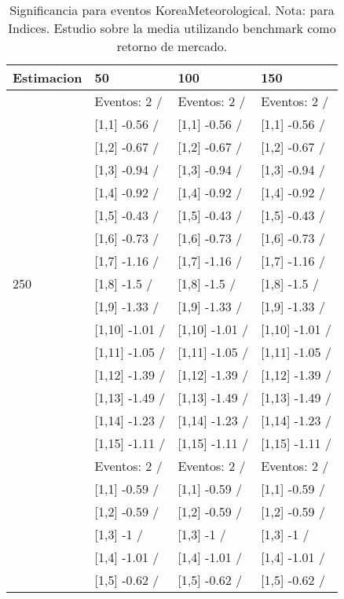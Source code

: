 \begin{table}

\caption{Significancia para eventos KoreaMeteorological. Nota: para Indices. Estudio sobre la media utilizando benchmark como retorno de mercado.}
\centering
\begin{tabular}[t]{llll}
\toprule
Estimacion & 50 & 100 & 150\\
\midrule
 & Eventos:  2 / & Eventos:  2 / & Eventos:  2 /\\
 & {}[1,1] -0.56  / & {}[1,1] -0.56  / & {}[1,1] -0.56  /\\
 & {}[1,2] -0.67  / & {}[1,2] -0.67  / & {}[1,2] -0.67  /\\
 & {}[1,3] -0.94  / & {}[1,3] -0.94  / & {}[1,3] -0.94  /\\
 & {}[1,4] -0.92  / & {}[1,4] -0.92  / & {}[1,4] -0.92  /\\
\addlinespace
 & {}[1,5] -0.43  / & {}[1,5] -0.43  / & {}[1,5] -0.43  /\\
 & {}[1,6] -0.73  / & {}[1,6] -0.73  / & {}[1,6] -0.73  /\\
 & {}[1,7] -1.16  / & {}[1,7] -1.16  / & {}[1,7] -1.16  /\\
250 & {}[1,8] -1.5  / & {}[1,8] -1.5  / & {}[1,8] -1.5  /\\
 & {}[1,9] -1.33  / & {}[1,9] -1.33  / & {}[1,9] -1.33  /\\
\addlinespace
 & {}[1,10] -1.01  / & {}[1,10] -1.01  / & {}[1,10] -1.01  /\\
 & {}[1,11] -1.05  / & {}[1,11] -1.05  / & {}[1,11] -1.05  /\\
 & {}[1,12] -1.39  / & {}[1,12] -1.39  / & {}[1,12] -1.39  /\\
 & {}[1,13] -1.49  / & {}[1,13] -1.49  / & {}[1,13] -1.49  /\\
 & {}[1,14] -1.23  / & {}[1,14] -1.23  / & {}[1,14] -1.23  /\\
\addlinespace
 & {}[1,15] -1.11  / & {}[1,15] -1.11  / & {}[1,15] -1.11  /\\
 & Eventos:  2 / & Eventos:  2 / & Eventos:  2 /\\
 & {}[1,1] -0.59  / & {}[1,1] -0.59  / & {}[1,1] -0.59  /\\
 & {}[1,2] -0.59  / & {}[1,2] -0.59  / & {}[1,2] -0.59  /\\
 & {}[1,3] -1  / & {}[1,3] -1  / & {}[1,3] -1  /\\
\addlinespace
 & {}[1,4] -1.01  / & {}[1,4] -1.01  / & {}[1,4] -1.01  /\\
 & {}[1,5] -0.62  / & {}[1,5] -0.62  / & {}[1,5] -0.62  /\\

\end{tabular}
\end{table}
